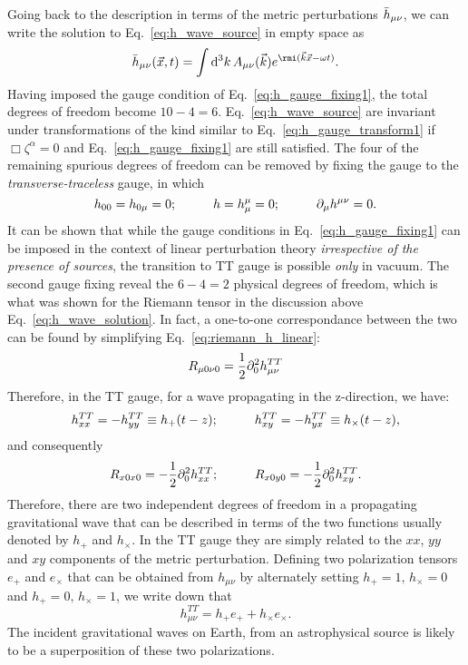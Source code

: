 Going back to the description in terms of the metric perturbations 
$\bar{h}_{\mu\nu}$, we can write the solution to Eq.~\ref{eq:h_wave_source}
in empty space as
\begin{equation}\label{eq:h_wave_solution}
 \hbarr_{\mu\nu}(\vec{x},t) = \int \D^3 k\, A_{\mu\nu}(\vec{k}) e^{\ii (\vec{k}\dotfill \vec{x} - \omega t)}.
\end{equation}
Having imposed the gauge condition of Eq.~\ref{eq:h_gauge_fixing1}, the total 
degrees of freedom become $10 - 4 = 6$. Eq.~\ref{eq:h_wave_source} are invariant
under transformations of the kind similar to Eq.~\ref{eq:h_gauge_transform1}
if $\Box\zeta^\alpha = 0$ and Eq.~\ref{eq:h_gauge_fixing1} are still satisfied.
The four of the remaining spurious degrees of freedom can be removed by fixing
the gauge to the {\it transverse-traceless} gauge, in which
\begin{equation}\label{eq:h_gauge_fixing2}
 h_{00} = h_{0\mu} = 0;\hspace{10mm} h = h^\mu_\mu = 0;\hspace{10mm} \pd_\mu h^{\mu\nu} = 0.
\end{equation}
It can be shown that while the gauge conditions in Eq.~\ref{eq:h_gauge_fixing1}
can be imposed in the context of linear perturbation theory {\it irrespective of
the presence of sources}, the transition to TT gauge is possible {\it only} in 
vacuum. 
%
The second gauge fixing reveal the $6 - 4 = 2$ physical degrees of freedom, which
is what was shown for the Riemann tensor in the discussion above 
Eq.~\ref{eq:h_wave_solution}. 
In fact, a one-to-one correspondance between the two can be found by simplifying 
Eq.~\ref{eq:riemann_h_linear}:
%
\begin{equation}
 R_{\mu 0\nu 0} = \frac{1}{2}\partial_0^2 h^{TT}_{\mu\nu}
\end{equation}
%
Therefore, in the TT gauge, for a wave propagating in the z-direction, we have:
\begin{equation}
 h_{xx}^{TT} = -h_{yy}^{TT} \equiv h_+(t-z);\hspace{10mm} h_{xy}^{TT} = -h_{yx}^{TT} \equiv h_\times(t-z),
\end{equation}
and consequently
\begin{equation}
 R_{x0x0} = -\frac{1}{2}\pd_0^2 h_{xx}^{TT};\hspace{10mm} R_{x0y0} = -\frac{1}{2}\pd_0^2 h_{xy}^{TT}.
\end{equation}
Therefore, there are two independent degrees of freedom in a propagating 
gravitational wave that can be described in terms of the two functions 
usually denoted by $h_+$ and $h_\times$. In the TT gauge they are simply
related to the $xx$, $yy$ and $xy$ components of the metric perturbation.
Defining two polarization tensors $e_+$ and $e_\times$ that can be obtained
from $h_{\mu\nu}$ by alternately setting $h_+=1,\,h_\times=0$ and 
$h_+=0,\,h_\times=1$, we write down that 
\begin{equation}
 h_{\mu\nu}^{TT} = h_+ e_+ + h_\times e_\times.
\end{equation}
The incident gravitational waves on Earth, from an astrophysical source 
is likely to be a superposition of these two polarizations. 



